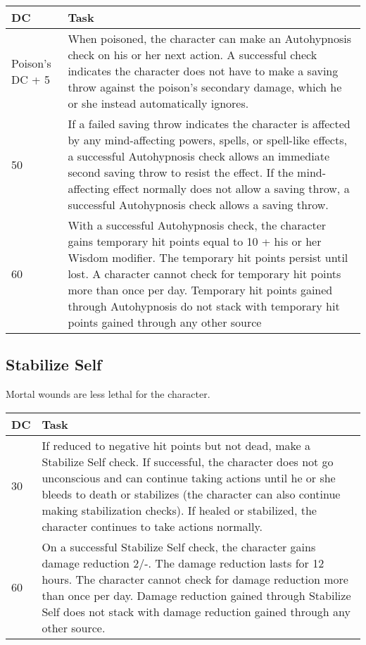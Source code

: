 \documentclass{article}
\begin{document}
\begin{tabular}{|>{\raggedright}p{45pt}|>{\raggedright}p{280pt}|}
\hline
D\textbf{C} & T\textbf{ask}\tabularnewline
\hline
Poison's DC + 5 & When poisoned, the character can make an Autohypnosis check on 
his or her next action. A successful check indicates the character does not have 
to make a saving throw against the poison's secondary damage, which he or she instead 
automatically ignores. \tabularnewline
\hline
50  & If a failed saving throw indicates the character is affected by any mind-affecting 
powers, spells, or spell-like effects, a successful Autohypnosis check allows an 
immediate second saving throw to resist the effect. If the mind-affecting effect 
normally does not allow a saving throw, a successful Autohypnosis check allows 
a saving throw. \tabularnewline
\hline
60  & With a successful Autohypnosis check, the character gains temporary hit points 
equal to 10 + his or her Wisdom modifier. The temporary hit points persist until 
lost. A character cannot check for temporary hit points more than once per day. 
Temporary hit points gained through Autohypnosis do not stack with temporary hit 
points gained through any other source \tabularnewline
\hline
\end{tabular}

\vspace{12pt}
\subsection*{Stabilize Self }

Mortal wounds are less lethal for the character. 

\begin{tabular}{|>{\raggedright}p{10pt}|>{\raggedright}p{315pt}|}
\hline
D\textbf{C} & T\textbf{ask }\tabularnewline
\hline
30 & If reduced to negative hit points but not dead, make a Stabilize Self check. 
If successful, the character does not go unconscious and can continue taking actions 
until he or she bleeds to death or stabilizes (the character can also continue 
making stabilization checks). If healed or stabilized, the character continues 
to take actions normally. \tabularnewline
\hline
60  & On a successful Stabilize Self check, the character gains damage reduction 
2/-. The damage reduction lasts for 12 hours. The character cannot check for damage 
reduction more than once per day. Damage reduction gained through Stabilize Self 
does not stack with damage reduction gained through any other source. \tabularnewline
\hline
\end{tabular}
\end{document}
